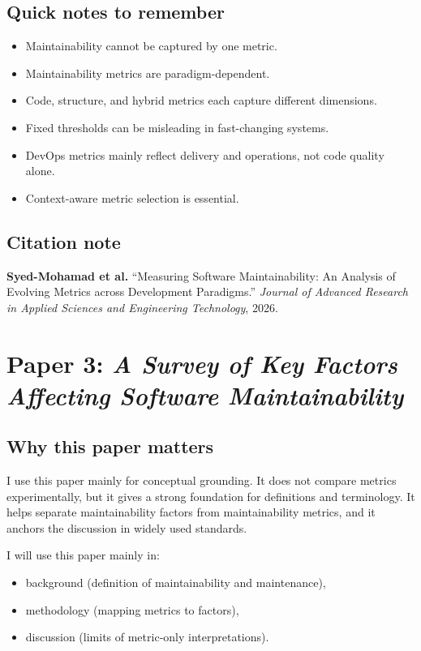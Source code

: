 \documentclass[11pt,a4paper]{article}
\begin{document}
\subsection{Quick notes to remember}
\begin{itemize}[leftmargin=*]
  \item Maintainability cannot be captured by one metric.
  \item Maintainability metrics are paradigm-dependent.
  \item Code, structure, and hybrid metrics each capture different dimensions.
  \item Fixed thresholds can be misleading in fast-changing systems.
  \item DevOps metrics mainly reflect delivery and operations, not code quality alone.
  \item Context-aware metric selection is essential.
\end{itemize}

\subsection{Citation note}
\noindent\textbf{Syed-Mohamad et al.} ``Measuring Software Maintainability: An Analysis of Evolving Metrics across Development Paradigms.'' \textit{Journal of Advanced Research in Applied Sciences and Engineering Technology}, 2026.

\newpage
\section{Paper 3: \textit{A Survey of Key Factors Affecting Software Maintainability}}

\subsection{Why this paper matters}
I use this paper mainly for conceptual grounding. It does not compare metrics experimentally, but it gives a strong foundation for definitions and terminology. It helps separate maintainability factors from maintainability metrics, and it anchors the discussion in widely used standards.

I will use this paper mainly in:
\begin{itemize}[leftmargin=*]
  \item background (definition of maintainability and maintenance),
  \item methodology (mapping metrics to factors),
  \item discussion (limits of metric-only interpretations).
\end{itemize}
\end{document}
